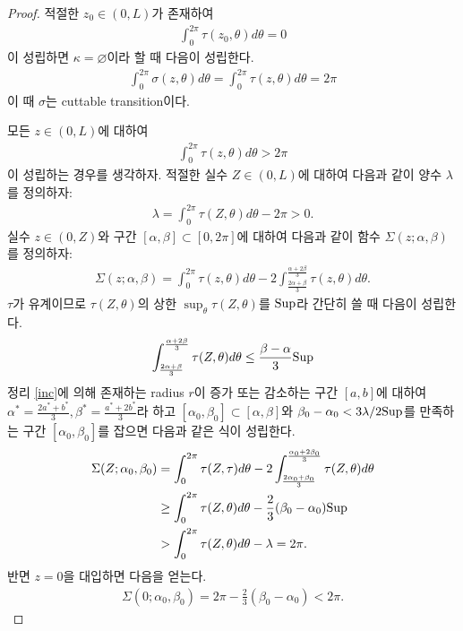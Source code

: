 \documentclass{amsart}
\theoremstyle{plain}
\theoremstyle{definition}
\theoremstyle{remark}
\begin{document}
\begin{proof}
적절한 $z_0\in(0,L)$가 존재하여
\begin{align*}
\int_0^{2\pi}\tau(z_0,\theta)d\theta=0
\end{align*}
이 성립하면 $\kappa=\varnothing$이라 할 때 다음이 성립한다.
\begin{align*}
\int_0^{2\pi}\sigma(z,\theta)d\theta=\int_0^{2\pi}\tau(z,\theta)d\theta=2\pi
\end{align*}
이 때 $\sigma$는 cuttable transition이다.

모든 $z\in(0,L)$에 대하여
\begin{align*}
\int_0^{2\pi}\tau(z,\theta)d\theta>2\pi
\end{align*}
이 성립하는 경우를 생각하자.
적절한 실수 $Z\in(0,L)$에 대하여 다음과 같이 양수 $\lambda$를 정의하자:
\begin{align*}
\lambda=\int_0^{2\pi}\tau(Z,\theta)d\theta-2\pi>0.
\end{align*}
실수 $z\in(0,Z)$와 구간 $[\alpha,\beta]\subset[0,2\pi]$에 대하여 다음과 같이 함수 $\Sigma(z;\alpha,\beta)$를 정의하자:
\begin{align*}
\Sigma(z;\alpha,\beta)=\int_0^{2\pi}\tau(z,\theta)d\theta-2\int_{\frac{2\alpha+\beta}3}^{\frac{\alpha+2\beta}3}\tau(z,\theta)d\theta.
\end{align*}
$\tau$가 유계이므로 $\tau(Z,\theta)$의 상한 $\sup_{\theta}\tau(Z,\theta)$를 ${\rm Sup}$라 간단히 쓸 때 다음이 성립한다.
\begin{align*}
\int_{\frac{2\alpha+\beta}3}^{\frac{\alpha+2\beta}3}\tau(Z,\theta)d\theta\le\frac{\beta-\alpha}3 {\rm Sup}
\end{align*}
정리 \ref{inc}에 의해 존재하는 radius $r$이 증가 또는 감소하는 구간 $[a,b]$에 대하여 $\alpha^*=\frac{2a^*+b^*}3, \beta^*=\frac{a^*+2b^*}3$라 하고 $[\alpha_0,\beta_0]\subset[\alpha,\beta]$와 $\beta_0-\alpha_0<3\lambda/2{\rm Sup}$를 만족하는 구간 $[\alpha_0,\beta_0]$를 잡으면 다음과 같은 식이 성립한다.
\begin{align*}
\Sigma(Z;\alpha_0,\beta_0)
&=\int_0^{2\pi}\tau(Z,\tau)d\theta-2\int_{\frac{2\alpha_0+\beta_0}3}^{\frac{\alpha_0+2\beta_0}3}\tau(Z,\theta)d\theta\\
&\ge\int_0^{2\pi}\tau(Z,\theta)d\theta-\frac23(\beta_0-\alpha_0){\rm Sup}\\
&>\int_0^{2\pi}\tau(Z,\theta)d\theta-\lambda=2\pi.
\end{align*}
반면 $z=0$을 대입하면 다음을 얻는다.
\begin{align*}
\Sigma(0;\alpha_0,\beta_0)=2\pi-\frac23(\beta_0-\alpha_0)<2\pi.

\end{align*}
\end{proof}
\end{document}

